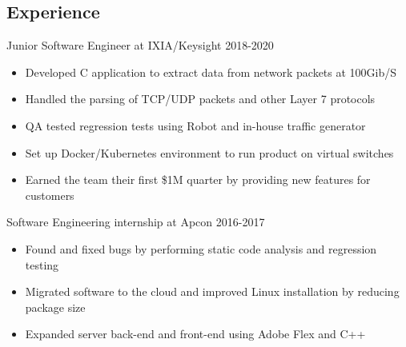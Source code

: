 \documentclass[line,margin]{res}
\begin{document}
	\address{(512)574-6609 ||
	\href{https://www.linkedin.com/in/randallblake/}{linkedin.com/in/randallblake} ||
	\href{mailto:blakerandall0@gmail.com}{blakerandall0@gmail.com}}

\begin{resume}

\vspace{8pt}

\vspace{-4pt}


\vspace{-4pt}
\section{Experience}
\vspace{12pt}


Junior Software Engineer at IXIA/Keysight
\hfill 2018-2020
	\begin{itemize} \itemsep -2pt
	\item Developed C application to extract data from network packets at 100Gib/S
	\item Handled the parsing of TCP/UDP packets and other Layer 7 protocols
	\item QA tested regression tests using Robot and in-house traffic generator
	\item Set up Docker/Kubernetes environment to run product on virtual switches
	\item Earned the team their first \$1M quarter by providing new features for customers
	\end{itemize}
\vspace{-8pt}
Software Engineering internship at Apcon
\hfill 2016-2017
\begin{itemize} \itemsep -2pt
	\item Found and fixed bugs by performing static code analysis and regression testing
	\item Migrated software to the cloud and improved Linux installation by reducing package size
	\item Expanded server back-end and front-end using Adobe Flex and C++


\end{itemize}
\end{resume}
\end{document}
